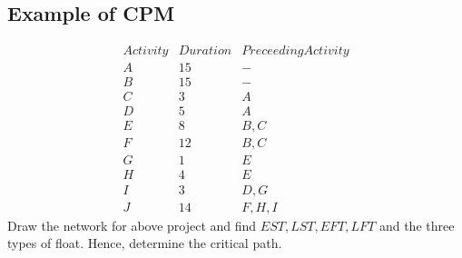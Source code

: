 \documentclass[oneside,11pt,pdftex]{book}%
\numberwithin{equation}{section}
\numberwithin{section}{chapter}
\numberwithin{equation}{chapter}
\begin{document}
\subsection{Example of CPM}
\[ \begin{matrix}
	Activity & Duration & Preceeding Activity\\
	A & 15 & - \\
	B & 15& - \\
	C & 3& A \\
	D & 5&A\\
	E & 8& B,C \\
	F & 12& B,C \\
	G & 1& E\\
	H & 4& E\\
	I & 3& D,G\\
	J & 14 & F,H,I
\end{matrix} \]
Draw the network for above project and find $ EST, LST, EFT, LFT $ and the three types of float. Hence, determine the critical path.
\end{document}
